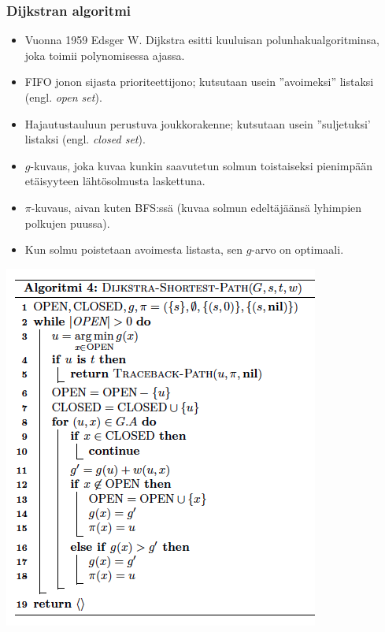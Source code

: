 \documentclass{beamer}
\begin{document}
\begin{frame}
  \frametitle{Dijkstran algoritmi}
  \begin{itemize}
    \item Vuonna 1959 Edsger W. Dijkstra esitti kuuluisan polunhakualgoritminsa, joka toimii polynomisessa ajassa.
    \item FIFO jonon sijasta prioriteettijono; kutsutaan usein ''avoimeksi'' listaksi (engl. \textit{open set}).
    \item Hajautustauluun perustuva joukkorakenne; kutsutaan usein ''suljetuksi' listaksi (engl. \textit{closed set}).
    \item $g$-kuvaus, joka kuvaa kunkin saavutetun solmun toistaiseksi pienimpään etäisyyteen lähtösolmusta laskettuna.
    \item $\pi$-kuvaus, aivan kuten BFS:ssä (kuvaa solmun edeltäjäänsä lyhimpien polkujen puussa).
    \item Kun solmu poistetaan avoimesta listasta, sen $g$-arvo on optimaali.
  \end{itemize}
\end{frame}

\begin{frame}
  \includegraphics[width=\textwidth,height=\textheight,keepaspectratio]{dijkstra}
\end{frame}
\end{document}
